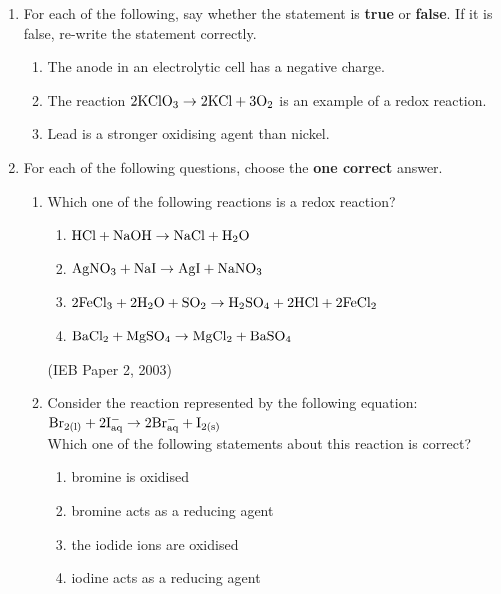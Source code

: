 \begin{eocexercises}{}

\begin{enumerate}

\item{For each of the following, say whether the statement is \textbf{true} or \textbf{false}. If it is false, re-write the statement correctly.}
	\begin{enumerate}
	\item{The anode in an electrolytic cell has a negative charge.}
	\item{The reaction $\rm{2KClO_{3} \rightarrow 2KCl + 3O_{2}}$ is an example of a redox reaction.}
	\item{Lead is a stronger oxidising agent than nickel.}
	\end{enumerate}

\item{For each of the following questions, choose the \textbf{one correct} answer.}

	\begin{enumerate}
	\item{Which one of the following reactions is a redox reaction?}
		\begin{enumerate}
		\item{$\rm{HCl + NaOH \rightarrow NaCl + H_{2}O}$}
		\item{$\rm{AgNO_{3} + NaI \rightarrow AgI + NaNO_{3}}$}
		\item{$\rm{2FeCl_{3} + 2H_{2}O + SO_{2} \rightarrow H_{2}SO_{4} + 2HCl + 2FeCl_{2}}$}
		\item{$\rm{BaCl_{2} + MgSO_{4} \rightarrow MgCl_{2} + BaSO_{4}}$}
		\end{enumerate}
(IEB Paper 2, 2003) 
	\item{Consider the reaction represented by the following equation:\\

$\rm{Br_{2(l)} + 2I^{-}_{aq} \rightarrow 2Br^{-}_{aq} + I_{2(s)}}$\\

Which one of the following statements about this reaction is correct?}
	
		\begin{enumerate}
		\item{bromine is oxidised}
		\item{bromine acts as a reducing agent}
		\item{the iodide ions are oxidised}
		\item{iodine acts as a reducing agent}
		\end{enumerate}


\end{enumerate}
\end{enumerate}
\end{eocexercises}
